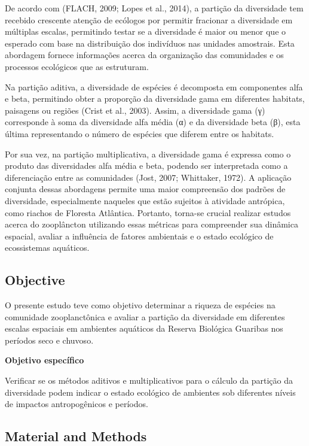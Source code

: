 \documentclass[
  letterpaper,
  DIV=11,
  numbers=noendperiod]{scrartcl}
\begin{document}
De acordo com (FLACH, 2009; Lopes et al., 2014), a partição da
diversidade tem recebido crescente atenção de ecólogos por permitir
fracionar a diversidade em múltiplas escalas, permitindo testar se a
diversidade é maior ou menor que o esperado com base na distribuição dos
indivíduos nas unidades amostrais. Esta abordagem fornece informações
acerca da organização das comunidades e os processos ecológicos que as
estruturam.

Na partição aditiva, a diversidade de espécies é decomposta em
componentes alfa e beta, permitindo obter a proporção da diversidade
gama em diferentes habitats, paisagens ou regiões (Crist et al., 2003).
Assim, a diversidade gama (γ) corresponde à soma da diversidade alfa
média (α) e da diversidade beta (β), esta última representando o número
de espécies que diferem entre os habitats.

Por sua vez, na partição multiplicativa, a diversidade gama é expressa
como o produto das diversidades alfa média e beta, podendo ser
interpretada como a diferenciação entre as comunidades (Jost, 2007;
Whittaker, 1972). A aplicação conjunta dessas abordagens permite uma
maior compreensão dos padrões de diversidade, especialmente naqueles que
estão sujeitos à atividade antrópica, como riachos de Floresta
Atlântica. Portanto, torna-se crucial realizar estudos acerca do
zooplâncton utilizando essas métricas para compreender sua dinâmica
espacial, avaliar a influência de fatores ambientais e o estado
ecológico de ecossistemas aquáticos.

\subsection{Objective}\label{objective}

O presente estudo teve como objetivo determinar a riqueza de espécies na
comunidade zooplanctônica e avaliar a partição da diversidade em
diferentes escalas espaciais em ambientes aquáticos da Reserva Biológica
Guaribas nos períodos seco e chuvoso.

\textbf{Objetivo específico}

Verificar se os métodos aditivos e multiplicativos para o cálculo da
partição da diversidade podem indicar o estado ecológico de ambientes
sob diferentes níveis de impactos antropogênicos e períodos.

\subsection{Material and Methods}\label{material-and-methods}
\end{document}
